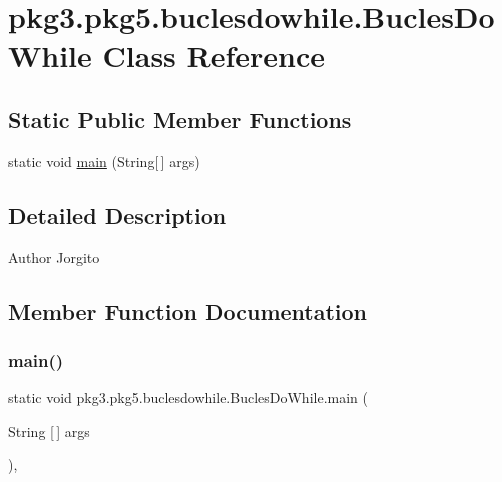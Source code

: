 \hypertarget{classpkg3_1_1pkg5_1_1buclesdowhile_1_1_bucles_do_while}{}\section{pkg3.\+pkg5.\+buclesdowhile.\+Bucles\+Do\+While Class Reference}
\label{classpkg3_1_1pkg5_1_1buclesdowhile_1_1_bucles_do_while}
\subsection*{Static Public Member Functions}
\begin{DoxyCompactItemize}
\item 
static void \mbox{\hyperlink{classpkg3_1_1pkg5_1_1buclesdowhile_1_1_bucles_do_while_a5521efdb2a83f6db421db233409a01c5}{main}} (String\mbox{[}$\,$\mbox{]} args)
\end{DoxyCompactItemize}


\subsection{Detailed Description}
\begin{DoxyAuthor}{Author}
Jorgito 
\end{DoxyAuthor}


\subsection{Member Function Documentation}
\mbox{\label{classpkg3_1_1pkg5_1_1buclesdowhile_1_1_bucles_do_while_a5521efdb2a83f6db421db233409a01c5}} 
\subsubsection{\texorpdfstring{main()}{main()}}
{\footnotesize\ttfamily static void pkg3.\+pkg5.\+buclesdowhile.\+Bucles\+Do\+While.\+main (\begin{DoxyParamCaption}\item[{String \mbox{[}$\,$\mbox{]}}]{args }\end{DoxyParamCaption})\hspace{0.3cm}{\ttfamily [inline]}, {\ttfamily [static]}}


